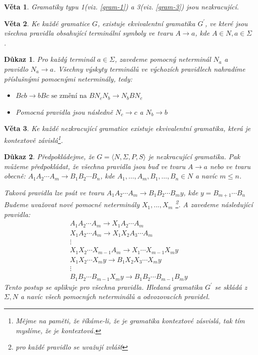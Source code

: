 \documentclass[10pt, a4paper, titlepage]{article}
\theoremstyle{note}
\newtheorem{dukaz}{Důkaz}
\newtheorem{veta}{Věta}
\begin{document}
\begin{veta}
Gramatiky typu 1(viz. \ref{gram-1}) a 3(viz. \ref{gram-3}) jsou nezkracující.
\end{veta}

\begin{veta}
Ke každé gramatice $G$, existuje ekvivalentní gramatika $G^{'}$, ve které
jsou všechna pravidla obsahující terminální symboly ve tvaru $A \rightarrow a$, kde $A \in N, a \in \Sigma$.
\end{veta}

\begin{dukaz}
Pro každý terminál $a \in \Sigma$, zavedeme pomocný neterminál $N_{a}$ a pravidlo $N_{a} \rightarrow a$.
Všechny výskyty terminálů ve výchozích pravidlech nahradíme příslušnými pomocnými neterminály, tedy:
\begin{itemize}
\item
$Bcb \rightarrow bBc \text{ se změní na } BN_{c}N_{b} \rightarrow N_{b} BN_{c}$

\item
Pomocná pravidla jsou následně $N_{c} \rightarrow c$ a $N_{b} \rightarrow b$
\end{itemize}
\end{dukaz}

\begin{veta}
Ke každé nezkracující gramatice existuje ekvivalentní gramatika, která je kontextově závislá\footnote{Mějme na paměti, že říkáme-li, že je
gramatika kontextové zásvislá, tak tím myslíme, že je kontextová.}.
\end{veta}

\begin{dukaz}
Předpokládejme, že $G = \langle N, \Sigma, P, S \rangle$ je nezkracující gramatika. Pak můžeme předpokládat, 
že všechna pravidla jsou buď ve tvaru $A \rightarrow a$ nebo ve tvaru obecně:
$A_{1} A_{2} \cdots A_{m} \rightarrow B_{1} B_{2} \cdots B_{n}$, kde $A_{1}, \ldots,A_{m}, B_{1}, \ldots,B_{n} \in N$ a navíc $m \leq n$. 

Taková pravidla lze psát ve tvaru $A_{1} A_{2} \cdots A_{m} \rightarrow B_{1} B_{2} \cdots B_{m}y$, kde $y = B_{m+1} \cdots B_{n}$ 
Budeme uvažovat nové pomocné neterminály $X_{1},...,X_{m}$ \footnote{pro každé pravidlo se uvažují zvlášť}. 
A zavedeme následující pravidla:
\begin{gather*}
A_{1} A_{2} \cdots A_{m} \rightarrow X_{1} A_{2} \cdots A_{m} \\
X_{1} A_{2} \cdots A_{m} \rightarrow X_{1} X_{2} A_{3} \cdots A_{m} \\
\vdots \\
X_{1} X_{2} \cdots X_{m-1} A_{m} \rightarrow X_{1} \cdots X_{m-1} X_{m}y \\
X_{1} X_{2} \cdots X_{m}y \rightarrow B_{1} X_{2} X_{3} \cdots X_{m}y \\
\vdots \\
B_{1} B_{2} \cdots B_{m-1} X_{m}y \rightarrow B_{1} B_{2} \cdots B_{m-1}B_{m}y
\end{gather*}
Tento postup se aplikuje pro všechna pravidla. Hledaná gramatika $G^{'}$ se skládá
z $\Sigma, N$ a navíc všech pomocných neterminálů a odvozovacích pravidel.
\end{dukaz}
\end{document}

